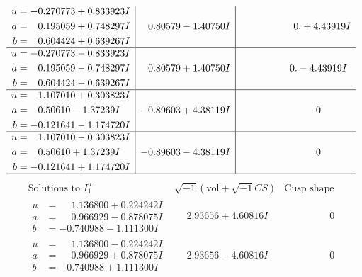 \documentclass[1p]{elsarticle_modified}
\theoremstyle{definition}
\newcommand{\I}{\sqrt{-1}}
\begin{document}
$$\begin{array}{c|c|c}
\begin{aligned}
u &= -0.270773 + 0.833923 I \\
a &= \phantom{-}0.195059 + 0.748297 I \\
b &= \phantom{-}0.604424 + 0.639267 I\end{aligned}
 & \phantom{-}0.80579 - 1.40750 I & \phantom{-0.000000 -}0. + 4.43919 I \\ \hline\begin{aligned}
u &= -0.270773 - 0.833923 I \\
a &= \phantom{-}0.195059 - 0.748297 I \\
b &= \phantom{-}0.604424 - 0.639267 I\end{aligned}
 & \phantom{-}0.80579 + 1.40750 I & \phantom{-0.000000 } 0. - 4.43919 I \\ \hline\begin{aligned}
u &= \phantom{-}1.107010 + 0.303823 I \\
a &= \phantom{-}0.50610 - 1.37239 I \\
b &= -0.121641 - 1.174720 I\end{aligned}
 & -0.89603 + 4.38119 I & \phantom{-0.000000 } 0 \\ \hline\begin{aligned}
u &= \phantom{-}1.107010 - 0.303823 I \\
a &= \phantom{-}0.50610 + 1.37239 I \\
b &= -0.121641 + 1.174720 I\end{aligned}
 & -0.89603 - 4.38119 I & \phantom{-0.000000 } 0\\
 \hline 
 \end{array}$$\newpage$$\begin{array}{c|c|c}  
\text{Solutions to }I^u_{1}& \I (\text{vol} + \sqrt{-1}CS) & \text{Cusp shape}\\
 \hline 
\begin{aligned}
u &= \phantom{-}1.136800 + 0.224242 I \\
a &= \phantom{-}0.966929 - 0.878075 I \\
b &= -0.740988 - 1.111300 I\end{aligned}
 & \phantom{-}2.93656 + 4.60816 I & \phantom{-0.000000 } 0 \\ \hline\begin{aligned}
u &= \phantom{-}1.136800 - 0.224242 I \\
a &= \phantom{-}0.966929 + 0.878075 I \\
b &= -0.740988 + 1.111300 I\end{aligned}
 & \phantom{-}2.93656 - 4.60816 I & \phantom{-0.000000 } 0 \\ \hline\begin{aligned}

\end{aligned}
\end{array}$$
\end{document}
